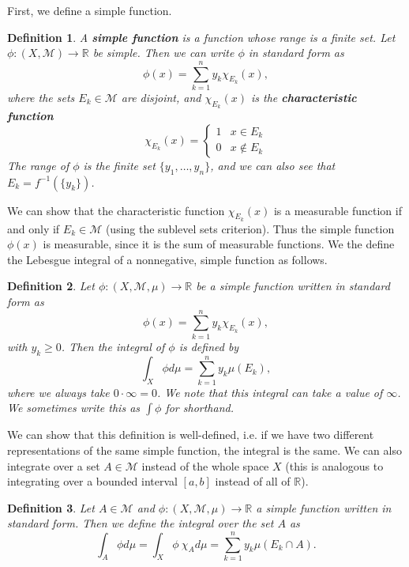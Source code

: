 \documentclass[12pt]{amsart}         %
\newtheorem{definition}{Definition}[section]
\theoremstyle{remark}
\newcommand{\R}{\mathbb{R}}
\begin{document}
First, we define a simple function.

\begin{definition}
A \textbf{simple function} is a function whose range is a finite set. Let $\phi: (X,\mathcal{M}) \rightarrow \R$ be simple. Then we can write $\phi$ in standard form as 
\[
\phi(x) = \sum_{k = 1}^n
y_k \chi_{E_k}(x),
\]
where the sets $E_k \in \mathcal{M}$ are disjoint, and $\chi_{E_k}(x)$ is the \textbf{characteristic function}
\[
\chi_{E_k}(x) = \begin{cases}
    1 & x \in E_k \\
    0 & x \notin E_k
\end{cases}
\]
The range of $\phi$ is the finite set $\{y_1, \dots, y_n\}$, and we can also see that $E_k = f^{-1}(\{ y_k \})$.
\end{definition}

We can show that the characteristic function $\chi_{E_k}(x)$ is a measurable function if and only if $E_k \in \mathcal{M}$ (using the sublevel sets criterion). Thus the simple function $\phi(x)$ is measurable, since it is the sum of measurable functions. We the define the Lebesgue integral of a nonnegative, simple function as follows.

\begin{definition}
Let $\phi: (X, \mathcal{M}, \mu) \rightarrow \R$ be a simple function written in standard form as 
\[
\phi(x) = \sum_{k = 1}^n
y_k \chi_{E_k}(x),
\]
with $y_k \geq 0$. Then the integral of $\phi$ is defined by
\[
\int_X \phi d\mu = \sum\limits_{k=1}^n y_k \mu(E_k),
\]
where we always take $0 \cdot \infty = 0$. We note that this integral can take a value of $\infty$. We sometimes write this as $\int \phi$ for shorthand. 
\end{definition}

We can show that this definition is well-defined, i.e. if we have two different representations of the same simple function, the integral is the same. We can also integrate over a set $A \in \mathcal{M}$ instead of the whole space $X$ (this is analogous to integrating over a bounded interval $[a,b]$ instead of all of $\R$).

\begin{definition}
Let $A \in \mathcal{M}$ and $\phi: (X, \mathcal{M}, \mu) \rightarrow \R$ a simple function written in standard form. Then we define the integral over the set $A$ as
\[
\int_A \phi d\mu = \int_X \phi \: \chi_A d \mu
= \sum\limits_{k=1}^n y_k \mu(E_k \cap A).
\]
\end{definition}
\end{document}
